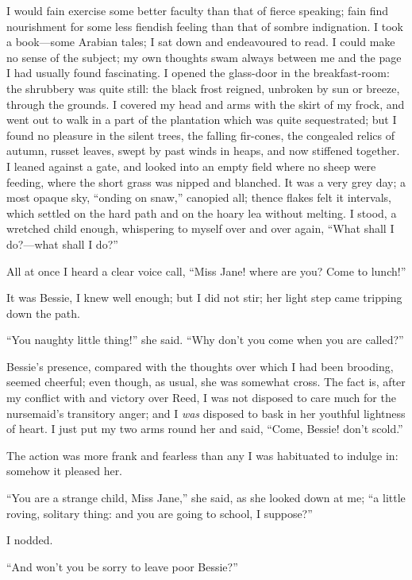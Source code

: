 I would fain exercise some better faculty than that of fierce speaking;
fain find nourishment for some less fiendish feeling than that of sombre
indignation. I took a book---some Arabian tales; I sat down and
endeavoured to read. I could make no sense of the subject; my own
thoughts swam always between me and the page I had usually found
fascinating. I opened the glass-door in the breakfast-room: the
shrubbery was quite still: the black frost reigned, unbroken by sun or
breeze, through the grounds. I covered my head and arms with the skirt
of my frock, and went out to walk in a part of the plantation which was
quite sequestrated; but I found no pleasure in the silent trees, the
falling fir-cones, the congealed relics of autumn, russet leaves, swept
by past winds in heaps, and now stiffened together. I leaned against a
gate, and looked into an empty field where no sheep were feeding, where
the short grass was nipped and blanched. It was a very grey day; a most
opaque sky, \enquote{onding on snaw,} canopied all; thence flakes felt
it intervals, which settled on the hard path and on the hoary lea
without melting. I stood, a wretched child enough, whispering to myself
over and over again, \enquote{What shall I do?---what shall I do?}

All at once I heard a clear voice call, \enquote{Miss Jane! where are
you? Come to lunch!}

It was Bessie, I knew well enough; but I did not stir; her light step
came tripping down the path.

\enquote{You naughty little thing!} she said. \enquote{Why don't you
come when you are called?}

Bessie's presence, compared with the thoughts over which I had been
brooding, seemed cheerful; even though, as usual, she was somewhat
cross. The fact is, after my conflict with and victory over \Mrs{} Reed,
I was not disposed to care much for the nursemaid's transitory anger;
and I \emph{was} disposed to bask in her youthful lightness of heart. I
just put my two arms round her and said, \enquote{Come, Bessie! don't
scold.}

The action was more frank and fearless than any I was habituated to
indulge in: somehow it pleased her.

\enquote{You are a strange child, Miss Jane,} she said, as she looked
down at me; \enquote{a little roving, solitary thing: and you are going
to school, I suppose?}

I nodded.

\enquote{And won't you be sorry to leave poor Bessie?}

